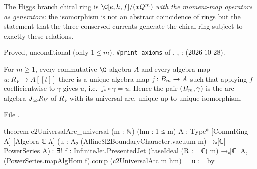 \begin{physics}
The Higgs branch chiral ring is $\C[e,h,f]/(x\ltwentyQ^m)$ \emph{with the moment-map operators as generators}: the
isomorphism is not an abstract coincidence of rings but the statement that the three conserved currents generate the
chiral ring subject to exactly these relations.
\end{physics}

\begin{status}
Proved, unconditional (only $1\le m$). \texttt{\#print axioms} of , ,
:  (2026-10-28).
\end{status}

\begin{theorem}\label{l20:thm:univarc}
For $m\ge1$, every commutative $\C$-algebra $A$ and every algebra map $u\colon R_V\to A[[t]]$ there is a unique algebra map
$f\colon B_m\to A$ such that applying $f$ coefficientwise to $\gamma$ gives $u$, i.e.\ $f_*\circ\gamma=u$. Hence the pair
$(B_m,\gamma)$ is the arc algebra $J_\infty R_V$ of $R_V$ with its universal arc, unique up to unique isomorphism.
\end{theorem}
\noindent File .
\begin{leancode}
theorem c2UniversalArc_universal (m : ℕ) (hm : 1 ≤ m) {A : Type*} [CommRing A] [Algebra ℂ A]
    (u : A₂ (AffineSl2BoundaryCharacter.vacuum m) →ₐ[ℂ] PowerSeries A) :
    ∃! f : InfiniteJet.PresentedJet (baseIdeal (R := ℂ) m) →ₐ[ℂ] A,
      (PowerSeries.mapAlgHom f).comp (c2UniversalArc m hm) = u := by
\end{leancode}

